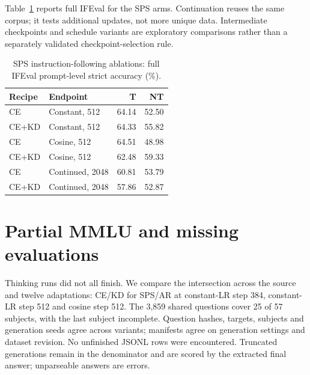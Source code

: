 Table~\ref{tab:ablations} reports full IFEval for the SPS arms. Continuation reuses the same corpus; it tests additional updates, not more unique data. Intermediate checkpoints and schedule variants are exploratory comparisons rather than a separately validated checkpoint-selection rule.

\begin{table}[h]
\centering\small
\begin{tabular}{llrr}
\toprule
Recipe & Endpoint & T & NT\\
\midrule
CE & Constant, 512 & 64.14 & 52.50\\
CE+KD & Constant, 512 & 64.33 & 55.82\\
CE & Cosine, 512 & 64.51 & 48.98\\
CE+KD & Cosine, 512 & 62.48 & 59.33\\
CE & Continued, 2048 & 60.81 & 53.79\\
CE+KD & Continued, 2048 & 57.86 & 52.87\\
\bottomrule
\end{tabular}
\caption{SPS instruction-following ablations: full IFEval prompt-level strict accuracy (\%).}
\label{tab:ablations}
\end{table}

\section{Partial MMLU and missing evaluations}
Thinking runs did not all finish. We compare the intersection across the source and twelve adaptations: CE/KD for SPS/AR at constant-LR step 384, constant-LR step 512 and cosine step 512. The 3,859 shared questions cover 25 of 57 subjects, with the last subject incomplete. Question hashes, targets, subjects and generation seeds agree across variants; manifests agree on generation settings and dataset revision. No unfinished JSONL rows were encountered. Truncated generations remain in the denominator and are scored by the extracted final answer; unparseable answers are errors.

